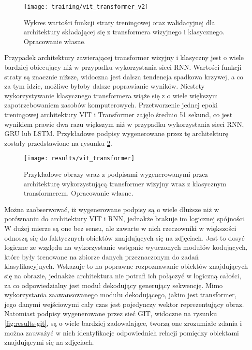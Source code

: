 \begin{figure}[H]
    \centering
    \texttt{[image: training/vit\_transformer\_v2]}
    \caption{Wykres wartości funkcji straty treningowej oraz walidacyjnej dla architektury składającej się z transformera wizyjnego i klasycznego. Opracowanie własne.}
    \label{fig:training-vit-transformer}
\end{figure}
\noindent Przypadek architektury zawierającej transformer wizyjny i klasyczny jest o wiele bardziej obiecujący niż w przypadku wykorzystania sieci RNN. Wartości funkcji straty są znacznie niższe, widoczna jest dalsza tendencja spadkowa krzywej, a co za tym idzie, możliwe byłoby dalsze poprawianie wyników. Niestety wykorzystywanie klasycznego transformera wiąże się z o wiele większym zapotrzebowaniem zasobów komputerowych. Przetworzenie jednej epoki treningowej architektury VIT i Transformer zajęło średnio 51 sekund, co jest wynikiem prawie dwa razu większym niż w przypadku wykorzystania sieci RNN, GRU lub LSTM. Przykładowe podpisy wygenerowane przez tę architekturę zostały przedstawione na rysunku \ref{fig:results-vit-transformer}.
\begin{figure}[H]
    \centering
    \texttt{[image: results/vit\_transformer]}
    \caption{Przykładowe obrazy wraz z podpisami wygenerowanymi przez architekturę wykorzystującą transformer wizyjny wraz z klasycznym transformerem. Opracowanie własne.}
    \label{fig:results-vit-transformer}
\end{figure}
\noindent Można zaobserwować, iż wygenerowane podpisy są o wiele dłuższe niż w porównaniu do architektury VIT i RNN, jednakże brakuje im logicznej spójności. W dużej mierze są one bez sensu, ale zawarte w nich rzeczowniki w większości odnoszą się do faktycznych obiektów znajdujących się na zdjęciach. Jest to dosyć logiczne ze względu na wykorzystanie wstępnie wyuczonych modułów kodujących, które były trenowane na zbiorze danych przeznaczonym do zadań klasyfikacyjnych. Wskazuje to na poprawne rozpoznawanie obiektów znajdujących się na obrazie, jednakże architektura nie potrafi ich połączyć w logiczną całości, za co odpowiedzialny jest moduł dekodujący generujący sekwencję. Mimo wykorzystania zaawansowanego modułu dekodującego, jakim jest transformer, jego danymi wejściowymi cały czas jest pojedynczy wektor reprezentujący obraz. Natomiast podpisy wygenerowane przez sieć GIT, widoczne na rysunku \ref{fig:results-git}, są o wiele bardziej zadowalające, tworzą one zrozumiałe zdania i można zauważyć w nich identyfikacje odpowiednich relacji pomiędzy obiektami znajdującymi się na zdjęciach.
